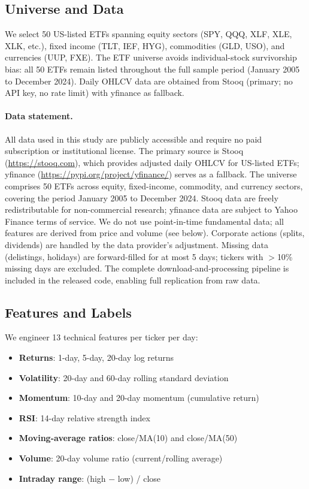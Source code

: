 \documentclass[preprint,review,12pt]{elsarticle}
\begin{document}
\subsection{Universe and Data}

We select 50 US-listed ETFs spanning equity sectors (SPY, QQQ, XLF, XLE, XLK, etc.), fixed income (TLT, IEF, HYG), commodities (GLD, USO), and currencies (UUP, FXE).
The ETF universe avoids individual-stock survivorship bias: all 50 ETFs remain listed throughout the full sample period (January 2005 to December 2024).
Daily OHLCV data are obtained from Stooq (primary; no API key, no rate limit) with yfinance as fallback.

\paragraph{Data statement.}
All data used in this study are publicly accessible and require no paid subscription or institutional license.
The primary source is Stooq (\url{https://stooq.com}), which provides adjusted daily OHLCV for US-listed ETFs; yfinance (\url{https://pypi.org/project/yfinance/}) serves as a fallback.
The universe comprises 50 ETFs across equity, fixed-income, commodity, and currency sectors, covering the period January 2005 to December 2024.
Stooq data are freely redistributable for non-commercial research; yfinance data are subject to Yahoo Finance terms of service.
We do not use point-in-time fundamental data; all features are derived from price and volume (see below).
Corporate actions (splits, dividends) are handled by the data provider's adjustment.
Missing data (delistings, holidays) are forward-filled for at most 5 days; tickers with $>$10\% missing days are excluded.
The complete download-and-processing pipeline is included in the released code, enabling full replication from raw data.

\subsection{Features and Labels}

We engineer 13 technical features per ticker per day:

\begin{itemize}[leftmargin=1.4em]
  \item \textbf{Returns}: 1-day, 5-day, 20-day log returns
  \item \textbf{Volatility}: 20-day and 60-day rolling standard deviation
  \item \textbf{Momentum}: 10-day and 20-day momentum (cumulative return)
  \item \textbf{RSI}: 14-day relative strength index
  \item \textbf{Moving-average ratios}: close/MA(10) and close/MA(50)
  \item \textbf{Volume}: 20-day volume ratio (current/rolling average)
  \item \textbf{Intraday range}: (high $-$ low) / close
\end{itemize}
\end{document}
